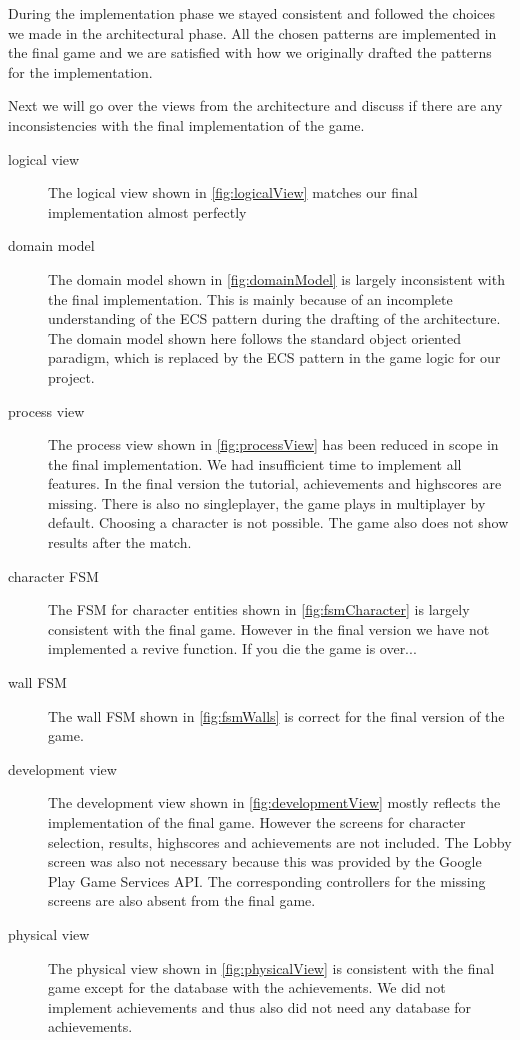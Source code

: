 During the implementation phase we stayed consistent and followed the choices we made in the architectural phase. All the chosen patterns are implemented in the final game and we are satisfied with how we originally drafted the patterns for the implementation.

Next we will go over the views from the architecture and discuss if there are any inconsistencies with the final implementation of the game.

\begin{description}
	\item[logical view] The logical view shown in \autoref{fig:logicalView} matches our final implementation almost perfectly
	\item[domain model] The domain model shown in \autoref{fig:domainModel} is largely inconsistent with the final implementation. This is mainly because of an incomplete understanding of the ECS pattern during the drafting of the architecture. The domain model shown here follows the standard object oriented paradigm, which is replaced by the ECS pattern in the game logic for our project.
	\item[process view] The process view shown in \autoref{fig:processView} has been reduced in scope in the final implementation. We had insufficient time to implement all features. In the final version the tutorial, achievements and highscores are missing. There is also no singleplayer, the game plays in multiplayer by default. Choosing a character is not possible. The game also does not show results after the match.
	\item[character FSM] The FSM for character entities shown in \autoref{fig:fsmCharacter} is largely consistent with the final game. However in the final version we have not implemented a revive function. If you die the game is over...
	\item[wall FSM] The wall FSM  shown in \autoref{fig:fsmWalls} is correct for the final version of the game.
	\item[development view] The development view shown in \autoref{fig:developmentView} mostly reflects the implementation of the final game. However the screens for character selection, results, highscores and achievements are not included. The Lobby screen was also not necessary because this was provided by the Google Play Game Services API. The corresponding controllers for the missing screens are also absent from the final game.
	\item[physical view] The physical view shown in \autoref{fig:physicalView} is consistent with the final game except for the database with the achievements. We did not implement achievements and thus also did not need any database for achievements.
\end{description}

